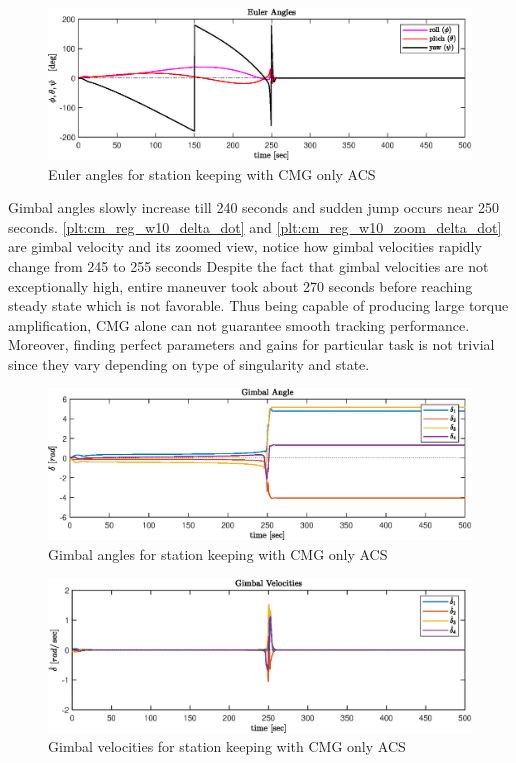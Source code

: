 \begin{figure}[H]
     \centering
    \includegraphics[width=0.9\columnwidth]{figures/plots/CMG/cm_reg_w10_ypr.eps}
    \caption{Euler angles for station keeping with CMG only ACS}
    \label{plt:cm_reg_w10_ypr}
\end{figure}
\noindent Gimbal angles slowly increase till 240 seconds and sudden jump occurs near 250 seconds. \autoref{plt:cm_reg_w10_delta_dot} and \autoref{plt:cm_reg_w10_zoom_delta_dot} are gimbal velocity and its zoomed view, notice how gimbal velocities rapidly change from 245 to 255 seconds Despite the fact that gimbal velocities are not exceptionally high, entire maneuver took about 270 seconds before reaching steady state which is not favorable. Thus being capable of producing large torque amplification, CMG alone can not guarantee smooth tracking performance. Moreover, finding perfect parameters and gains for particular task is not trivial since they vary depending on type of singularity and state.
\begin{figure}[H]
     \centering
    \includegraphics[width=0.9\columnwidth]{figures/plots/CMG/cm_reg_w10_delta.eps}
    \caption{Gimbal angles for station keeping with CMG only ACS}
    \label{plt:cm_reg_w10_delta}
\end{figure}

\begin{figure}[H]
     \centering
    \includegraphics[width=0.9\columnwidth]{figures/plots/CMG/cm_reg_w10_delta_dot.eps}
    \caption{Gimbal velocities for station keeping with CMG only ACS}
    \label{plt:cm_reg_w10_delta_dot}
\end{figure}


